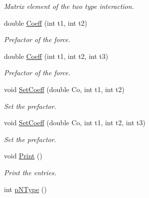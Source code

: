 \begin{DoxyCompactItemize}
\begin{DoxyCompactList}\small\item\em \-Matrix element of the two type interaction. \end{DoxyCompactList}\item 
\hypertarget{classMatInt_a1c5a9c480e688013bf93d9d5409319e5}{double \hyperlink{classMatInt_a1c5a9c480e688013bf93d9d5409319e5}{\-Coeff} (int t1, int t2)}\label{classMatInt_a1c5a9c480e688013bf93d9d5409319e5}

\begin{DoxyCompactList}\small\item\em \-Prefactor of the force. \end{DoxyCompactList}\item 
\hypertarget{classMatInt_ae8e7d621d6f37fce1bc204eb4d1a1079}{double \hyperlink{classMatInt_ae8e7d621d6f37fce1bc204eb4d1a1079}{\-Coeff} (int t1, int t2, int t3)}\label{classMatInt_ae8e7d621d6f37fce1bc204eb4d1a1079}

\begin{DoxyCompactList}\small\item\em \-Prefactor of the force. \end{DoxyCompactList}\item 
\hypertarget{classMatInt_a80ec8280d13d4c35f089d48a67e8e00b}{void \hyperlink{classMatInt_a80ec8280d13d4c35f089d48a67e8e00b}{\-Set\-Coeff} (double \-Co, int t1, int t2)}\label{classMatInt_a80ec8280d13d4c35f089d48a67e8e00b}

\begin{DoxyCompactList}\small\item\em \-Set the prefactor. \end{DoxyCompactList}\item 
\hypertarget{classMatInt_a34c5f2d111d2748ac8ddcdb4ef6a53b7}{void \hyperlink{classMatInt_a34c5f2d111d2748ac8ddcdb4ef6a53b7}{\-Set\-Coeff} (double \-Co, int t1, int t2, int t3)}\label{classMatInt_a34c5f2d111d2748ac8ddcdb4ef6a53b7}

\begin{DoxyCompactList}\small\item\em \-Set the prefactor. \end{DoxyCompactList}\item 
\hypertarget{classMatInt_a9dcac18006ce057b8d78c847174c1362}{void \hyperlink{classMatInt_a9dcac18006ce057b8d78c847174c1362}{\-Print} ()}\label{classMatInt_a9dcac18006ce057b8d78c847174c1362}

\begin{DoxyCompactList}\small\item\em \-Print the entries. \end{DoxyCompactList}\item 
\hypertarget{classMatInt_a6496acd0cba8289e8306507336dd2f88}{int \hyperlink{classMatInt_a6496acd0cba8289e8306507336dd2f88}{p\-N\-Type} ()}\label{classMatInt_a6496acd0cba8289e8306507336dd2f88}


\end{DoxyCompactItemize}
